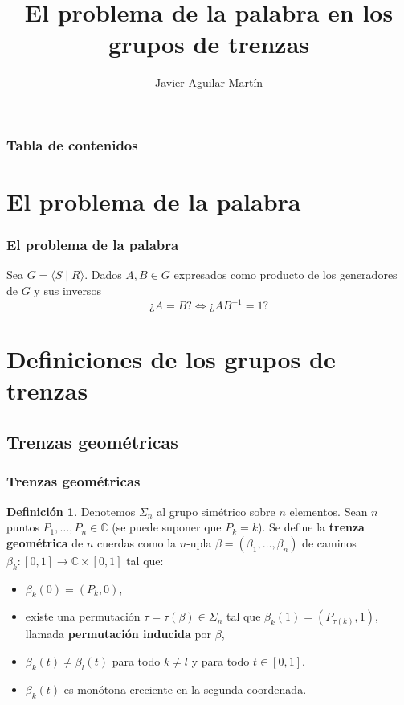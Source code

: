 \documentclass{beamer}
\title{El problema de la palabra en los grupos de trenzas}
\author{Javier Aguilar Martín}
\institute{Universidad de Sevilla}
\date{}
\theoremstyle{definition}
\newtheorem{defi}{Definición}
\newcommand{\C}{\mathbb{C}}
\providecommand{\gene}[1]{\langle{#1}\rangle}
\begin{document}
\frame{\titlepage}
%
%
% 
% 
% 
% 



\begin{frame}
\frametitle{Tabla de contenidos}
\tableofcontents
\end{frame}

\section{El problema de la palabra}

\begin{frame}
\frametitle{El problema de la palabra}
Sea $G=\gene{S\mid R}$. Dados $A,B\in G$ expresados como producto de los generadores de $G$ y sus inversos
\[
\mbox{¿}A=B?\Leftrightarrow \mbox{¿}AB^{-1}=1?
\]
\end{frame}

\section{Definiciones de los grupos de trenzas}

\subsection{Trenzas geométricas}

\begin{frame}
\frametitle{Trenzas geométricas}
\begin{defi}\label{geo}
Denotemos $\Sigma_n$ al grupo simétrico sobre $n$ elementos. Sean $n$ puntos $P_1,\dots, P_n\in\C$ (se puede suponer que $P_k=k$). Se define la \textbf{trenza geométrica} de $n$ cuerdas como la $n$-upla $\beta=(\beta_1,\dots,\beta_n)$ de caminos $\beta_k:[0,1]\to\C\times[0,1]$ tal que:
\begin{itemize}
\item<1-> $\beta_k(0)=(P_k,0)$,
\item<2-> existe una permutación $\tau=\tau(\beta)\in\Sigma_n$ tal que $\beta_k(1)=(P_{\tau(k)},1)$, llamada \textbf{permutación inducida} por $\beta$,
\item<3-> $\beta_k(t)\neq \beta_l(t)$ para todo $k\neq l$ y para todo $t\in[0,1]$.
\item<4-> $\beta_k(t)$ es monótona creciente en la segunda coordenada. 
\end{itemize}
\end{defi}
\end{frame}
\end{document}
